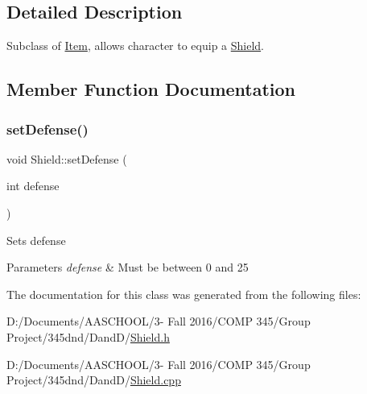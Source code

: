 \subsection{Detailed Description}
Subclass of \hyperlink{class_item}{Item}, allows character to equip a \hyperlink{class_shield}{Shield}. 

\subsection{Member Function Documentation}
\hypertarget{class_shield_a3e421a1c80aae934300dadf6db390bf1}{}\label{class_shield_a3e421a1c80aae934300dadf6db390bf1} 
\subsubsection{\texorpdfstring{set\+Defense()}{setDefense()}}
{\footnotesize\ttfamily void Shield\+::set\+Defense (\begin{DoxyParamCaption}\item[{int}]{defense }\end{DoxyParamCaption})}

Sets defense 
\begin{DoxyParams}{Parameters}
{\em defense} & Must be between 0 and 25 \\
\hline
\end{DoxyParams}


The documentation for this class was generated from the following files\+:\begin{DoxyCompactItemize}
\item 
D\+:/\+Documents/\+A\+A\+S\+C\+H\+O\+O\+L/3-\/ Fall 2016/\+C\+O\+M\+P 345/\+Group Project/345dnd/\+Dand\+D/\hyperlink{_shield_8h}{Shield.\+h}\item 
D\+:/\+Documents/\+A\+A\+S\+C\+H\+O\+O\+L/3-\/ Fall 2016/\+C\+O\+M\+P 345/\+Group Project/345dnd/\+Dand\+D/\hyperlink{_shield_8cpp}{Shield.\+cpp}\end{DoxyCompactItemize}
